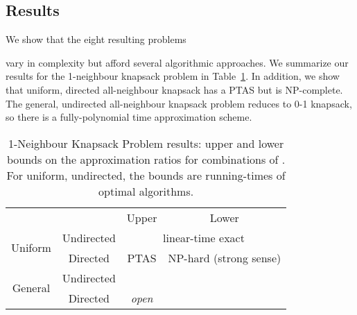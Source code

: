 \documentclass[12pt]{article}
\begin{document}
\subsection{Results}

We show that the eight resulting problems

vary in complexity but afford several algorithmic approaches.  We
summarize our results for the 1-neighbour knapsack problem in Table~\ref{tbl:results}.  In addition, we show that uniform, directed
all-neighbour knapsack has a PTAS but is NP-complete.  The general,
undirected all-neighbour knapsack problem reduces to 0-1 knapsack, so there is a fully-polynomial time approximation scheme.











\begin{table}[tb]
\begin{center}
\begin{tabular}{cccc}
\toprule

&  & Upper & Lower \\
\cmidrule(r){2-4}
\multirow{2}{*}{\hspace{3mm}Uniform\hspace{3mm}} & \hspace{3mm}Undirected\hspace{3mm} & \multicolumn{2}{c}{linear-time exact}  \\
\cmidrule(r){2-4}
& Directed & PTAS & \hspace{3mm}NP-hard (strong sense) \hspace{3mm} \\
\cmidrule(r){2-4}
\multirow{2}{*}{General} & Undirected & \hspace{3mm}\hspace{3mm} &    \\
\cmidrule(r){2-4}
& Directed & {\em open} &  \\
\bottomrule
\end{tabular}
\end{center}
\caption{\label{tbl:results} 1-Neighbour Knapsack Problem results:  upper and lower bounds on the approximation ratios for combinations of .  For uniform, undirected, the bounds are running-times of optimal algorithms.}


\end{table}
\end{document}
